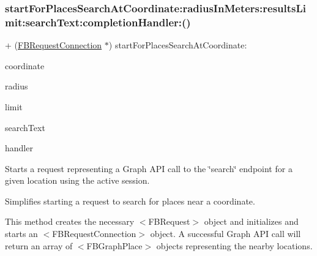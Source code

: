 \subsubsection{\texorpdfstring{start\+For\+Places\+Search\+At\+Coordinate\+:radius\+In\+Meters\+:results\+Limit\+:search\+Text\+:completion\+Handler\+:()}{startForPlacesSearchAtCoordinate:radiusInMeters:resultsLimit:searchText:completionHandler:()}\hspace{0.1cm}{\footnotesize\ttfamily [3/5]}}
{\footnotesize\ttfamily + (\hyperlink{interfaceFBRequestConnection}{F\+B\+Request\+Connection} $\ast$) start\+For\+Places\+Search\+At\+Coordinate\+: \begin{DoxyParamCaption}\item[{(C\+L\+Location\+Coordinate2D)}]{coordinate }\item[{radiusInMeters:(N\+S\+Integer)}]{radius }\item[{resultsLimit:(N\+S\+Integer)}]{limit }\item[{searchText:(N\+S\+String $\ast$)}]{search\+Text }\item[{completionHandler:(F\+B\+Request\+Handler)}]{handler }\end{DoxyParamCaption}}

Starts a request representing a Graph A\+PI call to the \char`\"{}search\char`\"{} endpoint for a given location using the active session.

Simplifies starting a request to search for places near a coordinate.

This method creates the necessary $<$\+F\+B\+Request$>$ object and initializes and starts an $<$\+F\+B\+Request\+Connection$>$ object. A successful Graph A\+PI call will return an array of $<$\+F\+B\+Graph\+Place$>$ objects representing the nearby locations.


